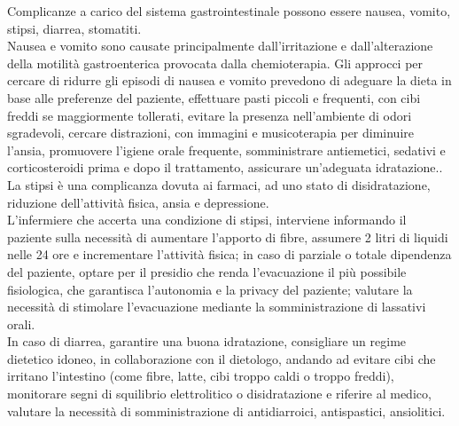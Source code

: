 Complicanze a carico del sistema gastrointestinale possono essere nausea, vomito, stipsi, diarrea, stomatiti.\\
Nausea e vomito sono causate principalmente dall’irritazione e dall’alterazione della motilità gastroenterica 
provocata dalla chemioterapia. Gli approcci per cercare di ridurre gli episodi di nausea e vomito prevedono di 
adeguare la dieta in base alle preferenze del paziente, effettuare pasti piccoli e frequenti, con cibi freddi se 
maggiormente tollerati, evitare la presenza nell’ambiente di odori sgradevoli, cercare distrazioni, con 
immagini e musicoterapia per diminuire l’ansia, promuovere l’igiene orale frequente, somministrare antiemetici, 
sedativi e corticosteroidi prima e dopo il trattamento, 
assicurare un’adeguata idratazione.\cite{effetticollaterali}.\\

La stipsi è una complicanza dovuta ai farmaci, ad uno stato di disidratazione, riduzione 
dell’attività fisica, ansia e depressione.\\ 
L’infermiere che accerta una condizione di stipsi, interviene informando il paziente sulla 
necessità di aumentare l’apporto di fibre, assumere 2 litri di liquidi nelle 24 ore e incrementare l’attività fisica; 
in caso di parziale o totale dipendenza del paziente, optare per il presidio che renda l’evacuazione il più 
possibile fisiologica, che garantisca l’autonomia e la privacy del paziente; valutare la necessità di stimolare 
l’evacuazione mediante la somministrazione di lassativi orali\cite{effetticollaterali}.\\ 

In caso di diarrea, garantire una buona idratazione, consigliare un regime dietetico idoneo, in collaborazione con il 
dietologo, andando ad evitare cibi che irritano l’intestino (come fibre, latte, cibi troppo caldi o troppo freddi), 
monitorare segni di squilibrio elettrolitico o disidratazione e riferire al medico, valutare la necessità di 
somministrazione di antidiarroici, antispastici, ansiolitici\cite{effetticollaterali}.\\

